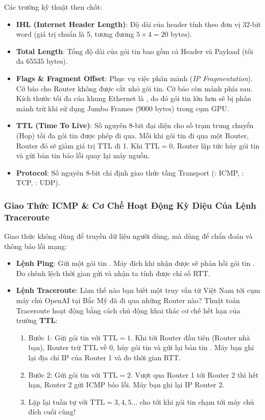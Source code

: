 Các trường kỹ thuật then chốt:
\begin{itemize}
  \item \textbf{IHL (Internet Header Length)}: Độ dài của header tính theo đơn vị 32-bit word (giá trị chuẩn là 5, tương đương $5 \times 4 = 20\text{ bytes}$).
  \item \textbf{Total Length}: Tổng độ dài của gói tin bao gồm cả Header và Payload (tối đa $65535\text{ bytes}$).
  \item \textbf{Flags \& Fragment Offset}: Phục vụ việc phân mảnh (\textit{IP Fragmentation}). Cờ  báo cho Router không được cắt nhỏ gói tin. Cờ  báo còn mảnh phía sau. Kích thước tối đa của khung Ethernet là , do đó gói tin lớn hơn sẽ bị phân mảnh trừ khi sử dụng Jumbo Frames ($9000\text{ bytes}$) trong cụm GPU.
  \item \textbf{TTL (Time To Live)}: Số nguyên 8-bit đại diện cho số trạm trung chuyển (Hop) tối đa gói tin được phép đi qua. Mỗi khi gói tin đi qua một Router, Router đó sẽ giảm giá trị TTL đi 1. Khi $\text{TTL} = 0$, Router lập tức hủy gói tin và gửi bản tin báo lỗi  quay lại máy nguồn.
  \item \textbf{Protocol}: Số nguyên 8-bit chỉ định giao thức tầng Transport (: ICMP, : TCP, : UDP).
\end{itemize}

\subsubsection{Giao Thức ICMP \& Cơ Chế Hoạt Động Kỳ Diệu Của Lệnh Traceroute}
Giao thức  không dùng để truyền dữ liệu người dùng, mà dùng để chẩn đoán và thông báo lỗi mạng:
\begin{itemize}
  \item \textbf{Lệnh Ping}: Gửi một gói tin . Máy đích khi nhận được sẽ phản hồi gói tin . Đo chênh lệch thời gian gửi và nhận ta tính được chỉ số RTT.
  \item \textbf{Lệnh Traceroute}: Làm thế nào bạn biết một truy vấn từ Việt Nam tới cụm máy chủ OpenAI tại Bắc Mỹ đã đi qua những Router nào?
  Thuật toán Traceroute hoạt động bằng cách chủ động khai thác cơ chế hết hạn của trường \textbf{TTL}:
  \begin{enumerate}
    \item Bước 1: Gửi gói tin với $\text{TTL} = 1$. Khi tới Router đầu tiên (Router nhà bạn), Router trừ TTL về 0, hủy gói tin và gửi lại bản tin . Máy bạn ghi lại địa chỉ IP của Router 1 và đo thời gian RTT.
    \item Bước 2: Gửi gói tin với $\text{TTL} = 2$. Vượt qua Router 1 tới Router 2 thì hết hạn, Router 2 gửi ICMP báo lỗi. Máy bạn ghi lại IP Router 2.
    \item Lặp lại tuần tự với $\text{TTL} = 3, 4, 5...$ cho tới khi gói tin chạm tới máy chủ đích cuối cùng!
  \end{enumerate}
\end{itemize}

